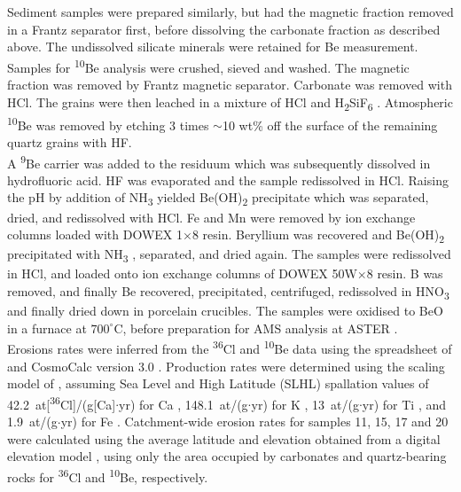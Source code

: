\documentclass[titlepage]{article}
\begin{document}
Sediment samples were prepared similarly, but had the magnetic
fraction removed in a Frantz separator first, before dissolving the
carbonate fraction as described above.  The undissolved silicate
minerals were retained for Be measurement.  Samples for
\textsuperscript{10}Be analysis were crushed, sieved and washed.  The
magnetic fraction was removed by Frantz magnetic separator.  Carbonate
was removed with HCl. The grains were then leached in a mixture of HCl
and H\textsubscript{2}SiF\textsubscript{6} . Atmospheric
\textsuperscript{10}Be was removed by etching 3 times $\sim$10 wt\%
off the surface of the remaining quartz grains with HF.\\

A \textsuperscript{9}Be carrier was added to the residuum which was
subsequently dissolved in hydrofluoric acid. HF was evaporated and the
sample redissolved in HCl. Raising the pH by addition of
NH\textsubscript{3} yielded Be(OH)\textsubscript{2} precipitate which
was separated, dried, and redissolved with HCl. Fe and Mn were removed
by ion exchange columns loaded with DOWEX 1$\times$8 resin. Beryllium
was recovered and Be(OH)\textsubscript{2} precipitated with
NH\textsubscript{3} , separated, and dried again. The samples were
redissolved in HCl, and loaded onto ion exchange columns of DOWEX
50W$\times$8 resin. B was removed, and finally Be recovered,
precipitated, centrifuged, redissolved in HNO\textsubscript{3} and
finally dried down in porcelain crucibles. The samples were oxidised
to BeO in a furnace at $700^{\circ}$C, before preparation for AMS
analysis at ASTER \citep{arnold2010}.\\

Erosions rates were inferred from the \textsuperscript{36}Cl and
\textsuperscript{10}Be data using the spreadsheet of
\citet{schimmelpfennig2009} and CosmoCalc version 3.0
\citep{vermeesch2007c}. Production rates were determined using the
scaling model of \citet{stone2000}, assuming Sea Level and High
Latitude (SLHL) spallation values of
42.2~at[\textsuperscript{36}Cl]/(g[Ca]$\cdot$yr) for Ca
\citep{schimmelpfennig2011}, 148.1~at/(g$\cdot$yr) for K
\citep{schimmelpfennig2014}, 13~at/(g$\cdot$yr) for Ti
\citep{fink2000}, and 1.9~at/(g$\cdot$yr) for Fe
\citep{stone2005}. Catchment-wide erosion rates for samples 11, 15, 17
and 20 were calculated using the average latitude and elevation
obtained from a digital elevation model \citep{vonblanckenburg2005},
using only the area occupied by carbonates and quartz-bearing rocks
for \textsuperscript{36}Cl and \textsuperscript{10}Be, respectively.
\end{document}
